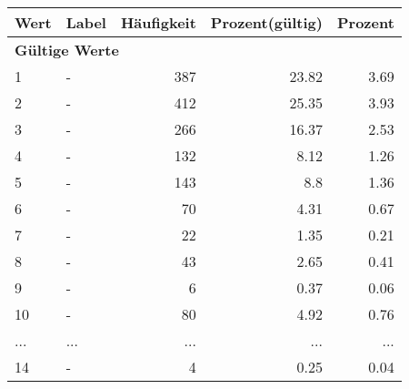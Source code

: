      \begin{longtable}{lXrrr}
     \toprule
     \textbf{Wert} & \textbf{Label} & \textbf{Häufigkeit} & \textbf{Prozent(gültig)} & \textbf{Prozent} \\
     \endhead
     \midrule
     \multicolumn{5}{l}{\textbf{Gültige Werte}}\\
        1 & \multicolumn{1}{X}{-} & %
          \num{387} &
          \num[round-mode=places,round-precision=2]{23,82} &
          \num[round-mode=places,round-precision=2]{3,69} \\
        2 & \multicolumn{1}{X}{-} & %
          \num{412} &
          \num[round-mode=places,round-precision=2]{25,35} &
          \num[round-mode=places,round-precision=2]{3,93} \\
        3 & \multicolumn{1}{X}{-} & %
          \num{266} &
          \num[round-mode=places,round-precision=2]{16,37} &
          \num[round-mode=places,round-precision=2]{2,53} \\
        4 & \multicolumn{1}{X}{-} & %
          \num{132} &
          \num[round-mode=places,round-precision=2]{8,12} &
          \num[round-mode=places,round-precision=2]{1,26} \\
        5 & \multicolumn{1}{X}{-} & %
          \num{143} &
          \num[round-mode=places,round-precision=2]{8,8} &
          \num[round-mode=places,round-precision=2]{1,36} \\
        6 & \multicolumn{1}{X}{-} & %
          \num{70} &
          \num[round-mode=places,round-precision=2]{4,31} &
          \num[round-mode=places,round-precision=2]{0,67} \\
        7 & \multicolumn{1}{X}{-} & %
          \num{22} &
          \num[round-mode=places,round-precision=2]{1,35} &
          \num[round-mode=places,round-precision=2]{0,21} \\
        8 & \multicolumn{1}{X}{-} & %
          \num{43} &
          \num[round-mode=places,round-precision=2]{2,65} &
          \num[round-mode=places,round-precision=2]{0,41} \\
        9 & \multicolumn{1}{X}{-} & %
          \num{6} &
          \num[round-mode=places,round-precision=2]{0,37} &
          \num[round-mode=places,round-precision=2]{0,06} \\
        10 & \multicolumn{1}{X}{-} & %
          \num{80} &
          \num[round-mode=places,round-precision=2]{4,92} &
          \num[round-mode=places,round-precision=2]{0,76} \\
       ... & ... & ... & ... & ... \\
        14 & \multicolumn{1}{X}{-} & %
          \num{4} &
          \num[round-mode=places,round-precision=2]{0,25} &
          \num[round-mode=places,round-precision=2]{0,04} \\


\end{longtable}
